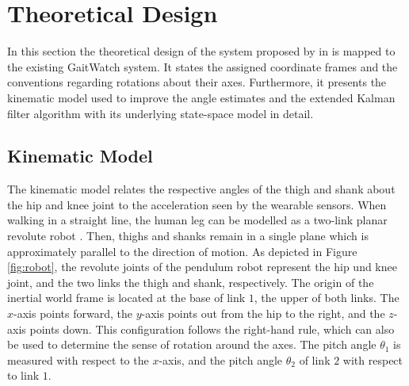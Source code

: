 \section{Theoretical Design}\label{sec:theoretical_design}

In this section the theoretical design of the system proposed by \citeauthor{bennett_motion_2014} in \cite{bennett_motion_2014} is mapped to the existing GaitWatch system. It states the assigned coordinate frames and the conventions regarding rotations about their axes. Furthermore, it presents the kinematic model used to improve the angle estimates and the extended Kalman filter algorithm with its underlying state-space model in detail.

\subsection{Kinematic Model}

The kinematic model relates the respective angles of the thigh and shank about the hip and knee joint to the acceleration seen by the wearable sensors. When walking in a straight line, the human leg can be modelled as a two-link planar revolute robot \cite{bennett_motion_2014}. Then, thighs and shanks remain in a single plane which is approximately parallel to the direction of motion. As depicted in Figure \ref{fig:robot}, the revolute joints of the pendulum robot represent the hip und knee joint, and the two links the thigh and shank, respectively. The origin of the inertial world frame is located at the base of link $1$, the upper of both links. The $x$-axis points forward, the $y$-axis points out from the hip to the right, and the $z$-axis points down. This configuration follows the right-hand rule, which can also be used to determine the sense of rotation around the axes. The pitch angle $\theta_1$ is measured with respect to the $x$-axis, and the pitch angle $\theta_2$ of link $2$ with respect to link $1$.

